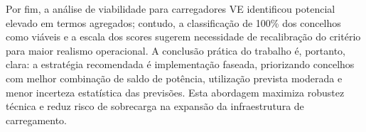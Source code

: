 Por fim, a análise de viabilidade para carregadores VE identificou potencial elevado em termos agregados; contudo, a classificação de 100\% dos concelhos como viáveis e a escala dos scores sugerem necessidade de recalibração do critério para maior realismo operacional. A conclusão prática do trabalho é, portanto, clara: a estratégia recomendada é implementação faseada, priorizando concelhos com melhor combinação de saldo de potência, utilização prevista moderada e menor incerteza estatística das previsões. Esta abordagem maximiza robustez técnica e reduz risco de sobrecarga na expansão da infraestrutura de carregamento.